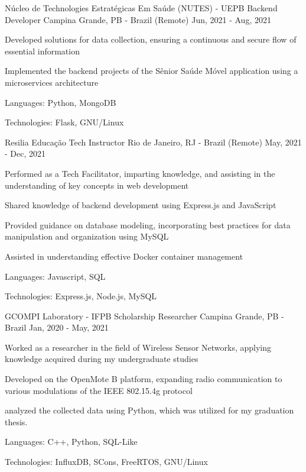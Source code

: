 \begin{cventries}
  \cventry
  {Núcleo de Technologies Estratégicas Em Saúde (NUTES) - UEPB} %
  {Backend Developer} %
  {Campina Grande, PB - Brazil (Remote)} %
  {Jun, 2021 - Aug, 2021} %
  {
    \begin{cvitems} %
      \item {Developed solutions for data collection, ensuring a continuous and secure flow of essential information}
      \item {Implemented the backend projects of the Sênior Saúde Móvel application using a microservices architecture}
      \item {Languages: Python, MongoDB}
      \item {Technologies: Flask, GNU/Linux}
    \end{cvitems}
  }

  \cventry
  {Resilia Educação} %
  {Tech Instructor} %
  {Rio de Janeiro, RJ - Brazil (Remote)} %
  {May, 2021 - Dec, 2021} %
  {
    \begin{cvitems} %
      \item {Performed as a Tech Facilitator, imparting knowledge, and assisting in the understanding of key concepts in web development}
      \item {Shared knowledge of backend development using Express.js and JavaScript}
      \item {Provided guidance on database modeling, incorporating best practices for data manipulation and organization using MySQL}
      \item {Assisted in understanding effective Docker container management}
      \item {Languages: Javascript, SQL}
      \item {Technologies: Express.js, Node.js, MySQL}
    \end{cvitems}
  }

  \cventry
  {GCOMPI Laboratory - IFPB} %
  {Scholarship Researcher} %
  {Campina Grande, PB - Brazil} %
  {Jan, 2020 - May, 2021} %
  {
    \begin{cvitems} %
      \item {Worked as a researcher in the field of Wireless Sensor Networks, applying knowledge acquired during my undergraduate studies}
      \item {Developed on the OpenMote B platform, expanding radio communication to various modulations of the IEEE 802.15.4g protocol}
      \item {analyzed the collected data using Python, which was utilized for my graduation thesis.}
      \item {Languages: C++, Python, SQL-Like}
      \item {Technologies: InfluxDB, SCons, FreeRTOS, GNU/Linux}
    \end{cvitems}
  }
\end{cventries}
